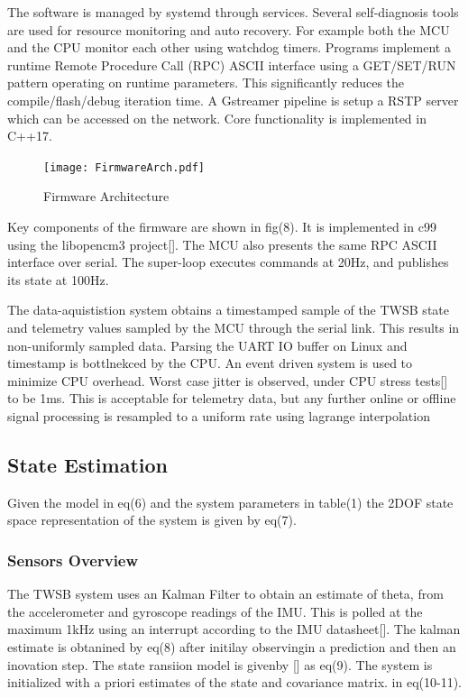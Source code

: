         The software is managed by systemd through services. 
        Several self-diagnosis tools are used for resource monitoring and auto recovery. 
        For example both the MCU and the CPU monitor each other using watchdog timers.
        Programs implement a runtime Remote Procedure Call (RPC) ASCII interface using 
        a GET/SET/RUN pattern operating on runtime parameters. This significantly reduces the compile/flash/debug 
        iteration time. A Gstreamer pipeline is setup a RSTP server which can be accessed on the network.
        Core functionality is implemented in C++17. 
        \begin{figure} [H]
            \texttt{[image: FirmwareArch.pdf]}
            \caption{Firmware Architecture}
        \end{figure}
        Key components of the firmware are shown in fig(8).
        It is implemented in c99 using the libopencm3 project[]. 
        The MCU also presents the same RPC ASCII interface over serial.
        The super-loop executes commands at 20Hz, 
        and publishes its state at 100Hz.

        The data-aquististion system obtains a timestamped sample of the TWSB state 
        and telemetry values sampled by the MCU through the serial link.
        This results in non-uniformly sampled data. Parsing the UART IO buffer on Linux 
        and timestamp is bottlnekced by the CPU. An event driven system is used to minimize CPU overhead.   
        Worst case jitter is observed, under CPU stress tests[] to be 1ms. This is acceptable for telemetry data, but
        any further online or offline signal processing is resampled to a uniform rate using lagrange interpolation \cite{DataStreamProcessing.}
        \pagebreak{}
    \subsection{State Estimation}
        Given the model in eq(6) and the system parameters in table(1) the 2DOF 
        state space representation of the system is given by eq(7).
        \subsubsection{Sensors Overview}
        The TWSB system uses an Kalman Filter to obtain an estimate of theta, 
        from the accelerometer and gyroscope readings of the IMU. 
        This is polled at the maximum 1kHz using an interrupt according to the IMU datasheet[]. 
        The kalman estimate is obtanined by eq(8)  after initilay observingin
         a prediction and then an inovation step.
        The state ransiion model is givenby [] as eq(9).  The system is initialized with a 
        priori estimates of the state and covariance matrix. in eq(10-11). 

